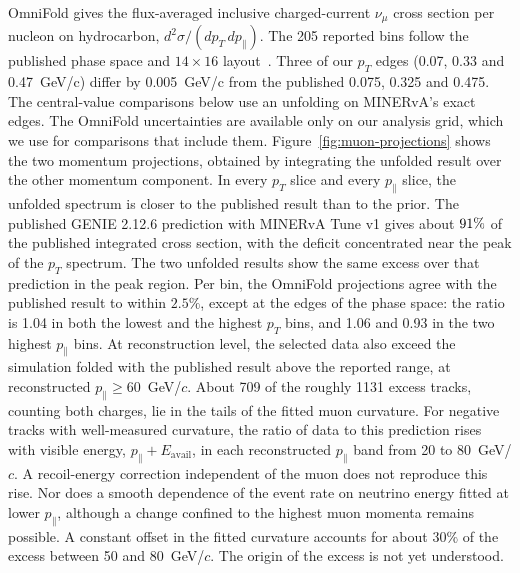 OmniFold gives the flux-averaged inclusive charged-current $\nu_\mu$ cross section per nucleon on hydrocarbon, $d^2\sigma/(dp_T\,dp_\parallel)$. The 205 reported bins follow the published phase space and $14\times16$ layout~\cite{MINERvA:2021owq}. Three of our $p_T$ edges (0.07, 0.33 and \SI{0.47}{GeV/c}) differ by \SI{0.005}{GeV/c} from the published 0.075, 0.325 and 0.475. The central-value comparisons below use an unfolding on MINERvA's exact edges. The OmniFold uncertainties are available only on our analysis grid, which we use for comparisons that include them. Figure~\ref{fig:muon-projections} shows the two momentum projections, obtained by integrating the unfolded result over the other momentum component. In every $p_T$ slice and every $p_\parallel$ slice, the unfolded spectrum is closer to the published result than to the prior. \label{sec:results-model}The published GENIE 2.12.6 prediction with MINERvA Tune v1 gives about $\fpeval{100*0.91}\%$ of the published integrated cross section, with the deficit concentrated near the peak of the $p_T$ spectrum. The two unfolded results show the same excess over that prediction in the peak region. Per bin, the OmniFold projections agree with the published result to within $2.5\%$, except at the edges of the phase space: the ratio is 1.04 in both the lowest and the highest $p_T$ bins, and 1.06 and 0.93 in the two highest $p_\parallel$ bins. At reconstruction level, the selected data also exceed the simulation folded with the published result above the reported range, at reconstructed $p_\parallel \geq 60$~GeV/$c$. About 709 of the roughly 1131 excess tracks, counting both charges, lie in the tails of the fitted muon curvature. For negative tracks with well-measured curvature, the ratio of data to this prediction rises with visible energy, $p_\parallel + E_{\mathrm{avail}}$, in each reconstructed $p_\parallel$ band from 20 to 80~GeV/$c$. A recoil-energy correction independent of the muon does not reproduce this rise. Nor does a smooth dependence of the event rate on neutrino energy fitted at lower $p_\parallel$, although a change confined to the highest muon momenta remains possible. A constant offset in the fitted curvature accounts for about $30\%$ of the excess between 50 and 80~GeV/$c$. The origin of the excess is not yet understood.

